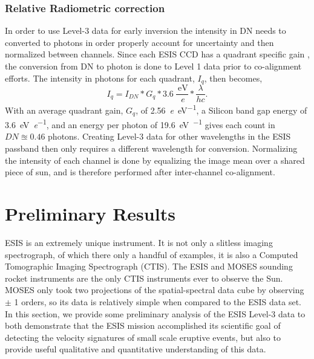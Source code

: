        	\subsubsection{Relative Radiometric correction }	 
   		In order to use Level-3 data for early inversion the intensity in DN needs to  converted to photons in order properly account for uncertainty and then normalized between channels.
   		Since each ESIS CCD has a quadrant specific gain \citep{ESIS}, the conversion from DN to photon is done to Level 1 data prior to co-alignment efforts.
   		The intensity in photons for each quadrant, $I_q$, then becomes,
   		\begin{equation}
	   		I_q = I_{DN} * G_q * 3.6\ \frac{\SI{}{\electronvolt}}{\SI{}{\elementarycharge}} * \frac{\lambda}{hc}.
   		\end{equation}
		With an average quadrant gain, $G_q$, of \SI[per-mode=symbol]{2.56}{\elementarycharge\per\electronvolt}, a Silicon band gap energy of \SI[per-mode=symbol]{3.6}{\electronvolt\per\elementarycharge}, and an energy per \ov photon of \SI[per-mode=symbol]{19.6}{\electronvolt\per\photon} gives each count in $DN \approxeq 0.46$ photons.
		Creating Level-3 data for other wavelengths in the ESIS passband then only requires a different wavelength for conversion.
   		Normalizing the intensity of each channel is done by equalizing the image mean over a shared piece of sun, and is therefore performed after inter-channel co-alignment. 
  

\section{Preliminary Results}

	   ESIS is an extremely unique instrument.  It is not only a slitless imaging spectrograph, of which there only a handful of examples, it is also a Computed Tomographic Imaging Spectrograph (CTIS).  The ESIS and MOSES sounding rocket instruments are the only CTIS instruments ever to observe the Sun. MOSES only took two projections of the spatial-spectral data cube by observing $\pm$ 1 orders, so its data is relatively simple when compared to the ESIS data set.   In this section, we provide some preliminary analysis of the ESIS Level-3 data to both demonstrate that the ESIS mission accomplished its scientific goal of detecting the velocity signatures of small scale eruptive events, but also to provide useful qualitative and quantitative understanding of this data.  
		
